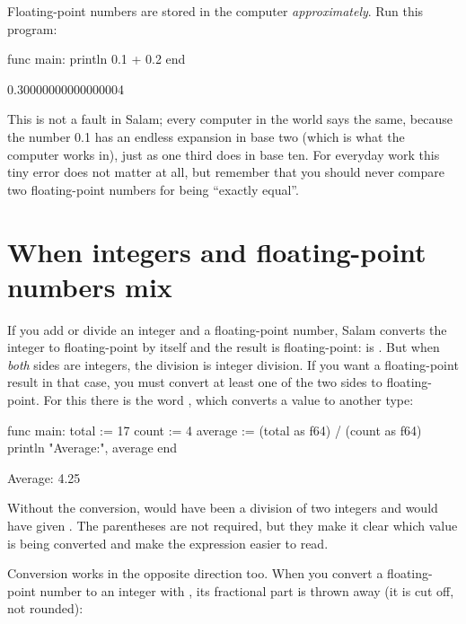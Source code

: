 \begin{warn}
Floating-point numbers are stored in the computer \emph{approximately}. Run
this program:
\begin{salamcode}
func main:
    println 0.1 + 0.2
end
\end{salamcode}
\begin{salamout}
0.30000000000000004
\end{salamout}

This is not a fault in Salam; every computer in the world says the same,
because the number 0.1 has an endless expansion in base two (which is what
the computer works in), just as one third does in base ten. For everyday
work this tiny error does not matter at all, but remember that you should
never compare two floating-point numbers for being ``exactly equal''.
\end{warn}

\section{When integers and floating-point numbers mix}

If you add or divide an integer and a floating-point number, Salam converts
the integer to floating-point by itself and the result is floating-point:
 is . But when \emph{both} sides are integers, the
division is integer division. If you want a floating-point result in that
case, you must convert at least one of the two sides to floating-point. For
this there is the word , which converts a value to another type:

\begin{salamcode}
func main:
    total := 17
    count := 4
    average := (total as f64) / (count as f64)
    println "Average:", average
end
\end{salamcode}

\begin{salamout}
Average: 4.25
\end{salamout}

Without the conversion,  would have been a division of
two integers and would have given . The parentheses are not
required, but they make it clear which value is being converted and make the
expression easier to read.

Conversion works in the opposite direction too. When you convert a
floating-point number to an integer with , its fractional part
is thrown away (it is cut off, not rounded):

